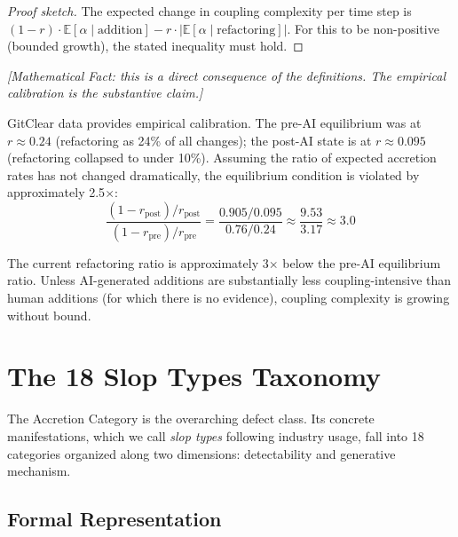 \documentclass[11pt, a4paper, logo, copyright]{googledeepmind}
\newcommand{\E}{\mathbb{E}}
\begin{document}
\begin{proof}[Proof sketch]
The expected change in coupling complexity per time step is $(1-r) \cdot \E[\alpha \mid \text{addition}] - r \cdot |\E[\alpha \mid \text{refactoring}]|$. For this to be non-positive (bounded growth), the stated inequality must hold.
\end{proof}

\emph{[Mathematical Fact: this is a direct consequence of the definitions. The empirical calibration is the substantive claim.]}

GitClear data provides empirical calibration. The pre-AI equilibrium was at $r \approx 0.24$ (refactoring as 24\% of all changes); the post-AI state is at $r \approx 0.095$ (refactoring collapsed to under 10\%). Assuming the ratio of expected accretion rates has not changed dramatically, the equilibrium condition is violated by approximately 2.5$\times$:
\begin{equation}
\frac{(1-r_{\text{post}}) / r_{\text{post}}}{(1-r_{\text{pre}}) / r_{\text{pre}}} = \frac{0.905 / 0.095}{0.76 / 0.24} \approx \frac{9.53}{3.17} \approx 3.0
\end{equation}

The current refactoring ratio is approximately 3$\times$ below the pre-AI equilibrium ratio. Unless AI-generated additions are substantially less coupling-intensive than human additions (for which there is no evidence), coupling complexity is growing without bound.


\section{The 18 Slop Types Taxonomy}
\label{sec:taxonomy}

The Accretion Category is the overarching defect class. Its concrete manifestations, which we call \emph{slop types} following industry usage, fall into 18 categories organized along two dimensions: detectability and generative mechanism.

\subsection{Formal Representation}
\end{document}
